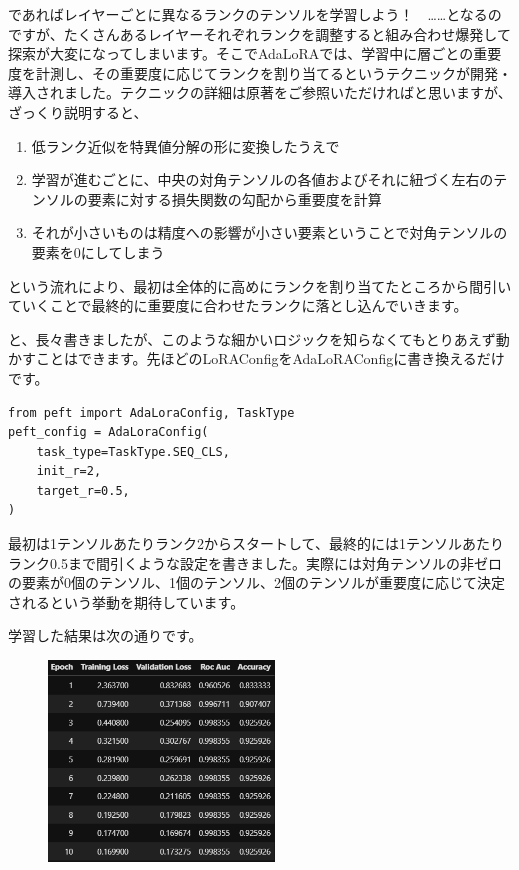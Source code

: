 \documentclass[a5paper,twoside,dvipdfmx]{jsarticle}
\begin{document}
であればレイヤーごとに異なるランクのテンソルを学習しよう！　……となるのですが、たくさんあるレイヤーそれぞれランクを調整すると組み合わせ爆発して探索が大変になってしまいます。そこでAdaLoRAでは、学習中に層ごとの重要度を計測し、その重要度に応じてランクを割り当てるというテクニックが開発・導入されました。テクニックの詳細は原著をご参照いただければと思いますが、ざっくり説明すると、

\begin{enumerate}
  \item 低ランク近似を特異値分解の形に変換したうえで
  \item 学習が進むごとに、中央の対角テンソルの各値およびそれに紐づく左右のテンソルの要素に対する損失関数の勾配から重要度を計算
  \item それが小さいものは精度への影響が小さい要素ということで対角テンソルの要素を0にしてしまう
\end{enumerate}

という流れにより、最初は全体的に高めにランクを割り当てたところから間引いていくことで最終的に重要度に合わせたランクに落とし込んでいきます。

と、長々書きましたが、このような細かいロジックを知らなくてもとりあえず動かすことはできます。先ほどのLoRAConfigをAdaLoRAConfigに書き換えるだけです。

\begin{lstlisting}
from peft import AdaLoraConfig, TaskType
peft_config = AdaLoraConfig(
    task_type=TaskType.SEQ_CLS,
    init_r=2,
    target_r=0.5,
)
\end{lstlisting}

最初は1テンソルあたりランク2からスタートして、最終的には1テンソルあたりランク0.5まで間引くような設定を書きました。実際には対角テンソルの非ゼロの要素が0個のテンソル、1個のテンソル、2個のテンソルが重要度に応じて決定されるという挙動を期待しています。

学習した結果は次の通りです。


\begin{figure}[h]
  \centering
  \includegraphics[width=60mm]{../C105Fig/gray/adalora_train.png}
 \end{figure} 
\end{document}
